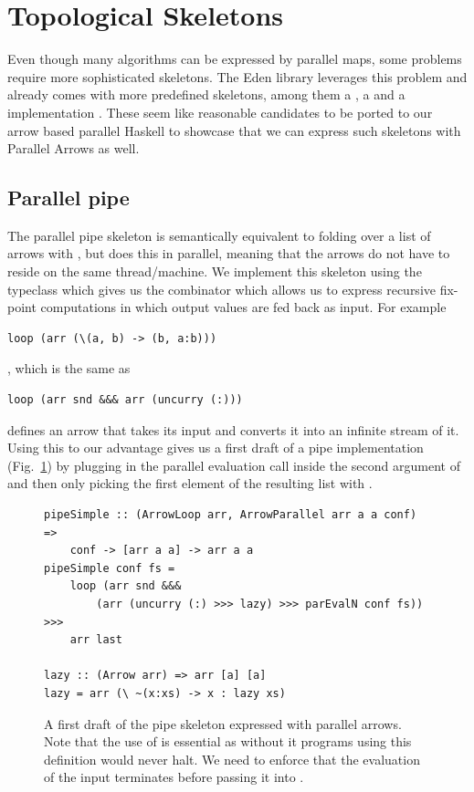 \FloatBarrier
\section{Topological Skeletons}
\label{sec:topology-skeletons}
Even though many algorithms can be expressed by parallel maps, some problems require more sophisticated skeletons. The Eden library leverages this problem and already comes with more predefined skeletons, among them a , a  and a  implementation \cite{Loogen2012, eden_skel_topology}. These seem like reasonable candidates to be ported to our arrow based parallel Haskell to showcase that we can express such skeletons with Parallel Arrows as well.

\subsection{Parallel pipe}

The parallel pipe skeleton is semantically equivalent to folding over a list \code{[arr a a]} of arrows with \code{>>>}, but does this in parallel, meaning that the arrows do not have to reside on the same thread/machine. We implement this skeleton using the  typeclass which gives us the  combinator which allows us to express recursive fix-point computations in which output values are fed back as input. For example %
\begin{lstlisting}[frame=htrbl]
loop (arr (\(a, b) -> (b, a:b)))
\end{lstlisting}
, which is the same as
\begin{lstlisting}[frame=htrbl]
loop (arr snd &&& arr (uncurry (:)))
\end{lstlisting}
defines an arrow that takes its input  and converts it into an infinite stream \code{[a]} of it. Using this to our advantage gives us a first draft of a pipe implementation (Fig.~\ref{fig:pipeSimple}) by plugging in the parallel evaluation call  inside the second argument of \code{(\&\&\&)} and then only picking the first element of the resulting list with .
\begin{figure}[h]
\begin{lstlisting}[frame=htrbl]
pipeSimple :: (ArrowLoop arr, ArrowParallel arr a a conf) =>
	conf -> [arr a a] -> arr a a
pipeSimple conf fs =
	loop (arr snd &&&
		(arr (uncurry (:) >>> lazy) >>> parEvalN conf fs)) >>>
	arr last

lazy :: (Arrow arr) => arr [a] [a]
lazy = arr (\ ~(x:xs) -> x : lazy xs)
\end{lstlisting}
\caption{A first draft of the pipe skeleton expressed with parallel arrows. Note that the use of  is essential as without it programs using this definition would never halt. We need to enforce that the evaluation of the input \code{[a]} terminates before passing it into .}
\label{fig:pipeSimple}
\end{figure}

